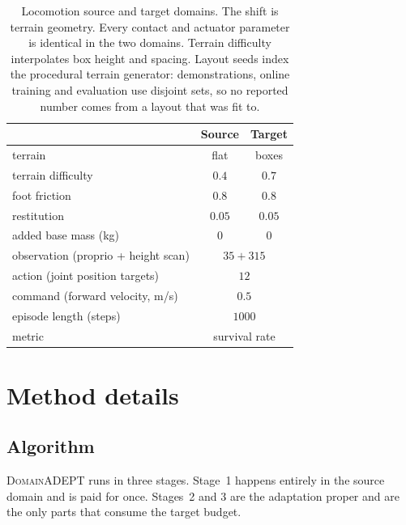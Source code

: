 \documentclass{article} %
\newcommand{\DomainADEPT}{\textsc{DomainADEPT}\xspace}
\begin{document}
\begin{table}[h]
\centering
\caption{Locomotion source and target domains. The shift is terrain geometry. Every contact and actuator parameter is identical in the two domains. Terrain difficulty interpolates box height and spacing. Layout seeds index the procedural terrain generator: demonstrations, online training and evaluation use disjoint sets, so no reported number comes from a layout that was fit to.}
\label{tab:app-target-loco}
\small
\begin{tabular}{lcc}
\toprule
 & Source & Target \\
\midrule
terrain                     & flat      & boxes \\
terrain difficulty          & $0.4$     & $0.7$ \\
foot friction               & $0.8$     & $0.8$ \\
restitution                 & $0.05$    & $0.05$ \\
added base mass (kg)        & $0$       & $0$ \\
\midrule
observation (proprio + height scan) & \multicolumn{2}{c}{$35 + 315$} \\
action (joint position targets)     & \multicolumn{2}{c}{$12$} \\
command (forward velocity, m/s)     & \multicolumn{2}{c}{$0.5$} \\
episode length (steps)              & \multicolumn{2}{c}{$1000$} \\
metric                              & \multicolumn{2}{c}{survival rate} \\
\bottomrule
\end{tabular}
\end{table}

\section{Method details}

\subsection{Algorithm}

\DomainADEPT runs in three stages. Stage~1 happens entirely in the source domain and is paid for once. Stages~2 and 3 are the adaptation proper and are the only parts that consume the target budget.
\end{document}
